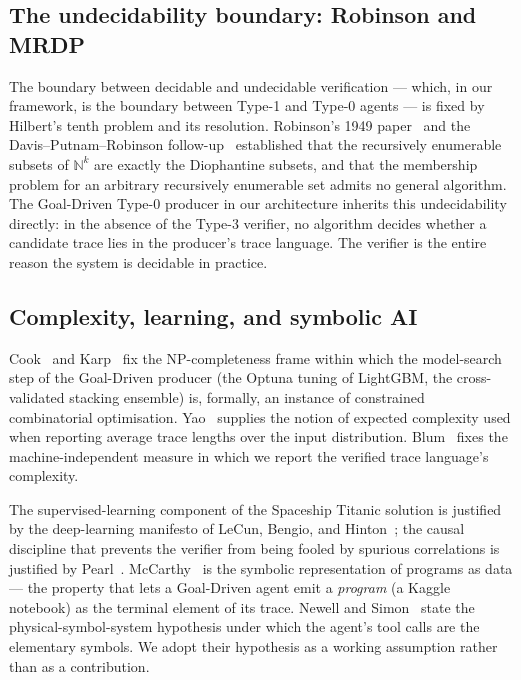 \subsection{The undecidability boundary: Robinson and MRDP}

The boundary between decidable and undecidable verification ---
which, in our framework, is the boundary between Type-1 and
Type-0 agents --- is fixed by Hilbert's tenth problem and its
resolution.  Robinson's 1949 paper~\cite{robinson1949definability}
and the Davis--Putnam--Robinson follow-up~\cite{davis1961decision}
established that the recursively enumerable subsets of
$\mathbb{N}^k$ are exactly the Diophantine subsets, and that
the membership problem for an arbitrary recursively enumerable
set admits no general algorithm.  The Goal-Driven Type-0 producer
in our architecture inherits this undecidability directly: in the
absence of the Type-3 verifier, no algorithm decides whether a
candidate trace lies in the producer's trace language.  The
verifier is the entire reason the system is decidable in
practice.

\subsection{Complexity, learning, and symbolic AI}

Cook~\cite{cook1971complexity} and Karp~\cite{karp1972reducibility}
fix the NP-completeness frame within which the model-search step
of the Goal-Driven producer (the Optuna tuning of LightGBM, the
cross-validated stacking ensemble) is, formally, an instance of
constrained combinatorial optimisation.
Yao~\cite{yao1977probabilistic} supplies the notion of expected
complexity used when reporting average trace lengths over the
input distribution.  Blum~\cite{blum1967machine} fixes the
machine-independent measure in which we report the verified
trace language's complexity.

The supervised-learning component of the Spaceship Titanic
solution is justified by the deep-learning manifesto of LeCun,
Bengio, and Hinton~\cite{hinton2015deep}; the causal discipline
that prevents the verifier from being fooled by spurious
correlations is justified by Pearl~\cite{pearl2009causality}.
McCarthy~\cite{mccarthy1960lisp} is the symbolic representation
of programs as data --- the property that lets a Goal-Driven
agent emit a \emph{program} (a Kaggle notebook) as the terminal
element of its trace.  Newell and Simon~\cite{newell1976physical}
state the physical-symbol-system hypothesis under which the
agent's tool calls are the elementary symbols.  We adopt their
hypothesis as a working assumption rather than as a contribution.

